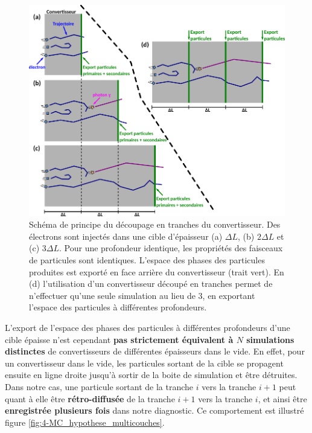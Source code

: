 \begin{refsection}
\begin{figure}[hbtp]
	\centering
	\includegraphics[width=\linewidth]{4-simulation/gp3m2_layers.png}
	\caption{Schéma de principe du découpage en tranches du convertisseur. Des électrons sont injectés dans une cible d'épaisseur (a) $\Delta L$, (b) $2\Delta L$ et (c) $3\Delta L$. Pour une profondeur identique, les propriétés des faisceaux de particules sont identiques. L'espace des phases des particules produites est exporté en face arrière du convertisseur (trait vert). En (d) l'utilisation d'un convertisseur découpé en tranches permet de n'effectuer qu'une seule simulation au lieu de 3, en exportant l'espace des particules à différentes profondeurs.}
	\label{fig:4-MC_tranches_gp3m2}
\end{figure}

L'export de l'espace des phases des particules à différentes profondeurs d'une cible épaisse n'est cependant \textbf{pas strictement équivalent à $N$ simulations distinctes} de convertisseurs de différentes épaisseurs dans le vide. En effet, pour un convertisseur dans le vide, les particules sortant de la cible se propagent ensuite en ligne droite jusqu'à sortir de la boite de simulation et être détruites. Dans notre cas, une particule sortant de la tranche $i$ vers la tranche $i+1$ peut quant à elle être \textbf{rétro-diffusée} de la tranche $i+1$ vers la tranche $i$, et ainsi être \textbf{enregistrée plusieurs fois} dans notre diagnostic. Ce comportement est illustré figure \ref{fig:4-MC_hypothese_multicouches}. 


\end{refsection}
